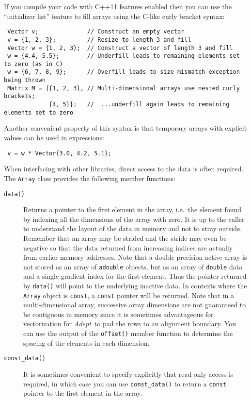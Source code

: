 \documentclass[a4,oneside]{book}
\def\codesize{\small}
\def\Adept{\emph{Adept}}
\def\code#1{{\codesize\texttt{#1}}}
\def\citem#1{\item[{\codesize\texttt{#1}}]}
\def\cxx11{\marginpar{\rotatebox[origin=rb]{90}{\textbf{C++11 only~~~}}}}
\begin{document}
\cxx11 \begin{leftbar} If you compile your code with C++11 features
  enabled then you can use the ``initializer list'' feature to fill
  arrays using the C-like curly bracket syntax:
\begin{lstlisting}
 Vector v;              // Construct an empty vector
 v = {1, 2, 3};         // Resize to length 3 and fill
 Vector w = {1, 2, 3};  // Construct a vector of length 3 and fill
 w = {4.4, 5.5};        // Underfill leads to remaining elements set to zero (as in C)
 w = {6, 7, 8, 9};      // Overfill leads to size_mismatch exception being thrown
 Matrix M = {{1, 2, 3}, // Multi-dimensional arrays use nested curly brackets;
             {4, 5}};   //  ...underfill again leads to remaining elements set to zero
\end{lstlisting}
Another convenient property of this syntax is that temporary arrays
with explicit values can be used in expressions:
\begin{lstlisting}
 v = w * Vector{3.0, 4.2, 5.1};
\end{lstlisting}
\end{leftbar}

When interfacing with other libraries, direct access to the data is
often required. The \code{Array} class provides the following member
functions:
\begin{description}
\citem{data()} Returns a pointer to the first element in the array,
i.e.\ the element found by indexing all the dimensions of the array
with zero. It is up to the caller to understand the layout of the data
in memory and not to stray outside.  Remember that an array may be
strided and the stride may even be negative so that the data returned
from increasing indices are actually from earlier memory
addresses. Note that a double-precision active array is not stored as
an array of \code{adouble} objects, but as an array of \code{double}
data and a single gradient index for the first element. Thus the
pointer returned by \code{data()} will point to the underlying
inactive data.  In contexts where the \code{Array} object is
\code{const}, a \code{const} pointer will be returned. Note that in a
multi-dimensional array, successive array dimensions are not
guaranteed to be contiguous in memory since it is sometimes
advantageous for vectorization for \Adept\ to pad the rows to an alignment
boundary. You can use the output of the \code{offset()} member
function to determine the spacing of the elements in each dimension.
%
\citem{const\_data()} It is sometimes convenient to specify explicitly
that read-only access is required, in which case you can use
\code{const\_data()} to return a \code{const} pointer to the first
element in the array.
\end{description} 
\end{document}
